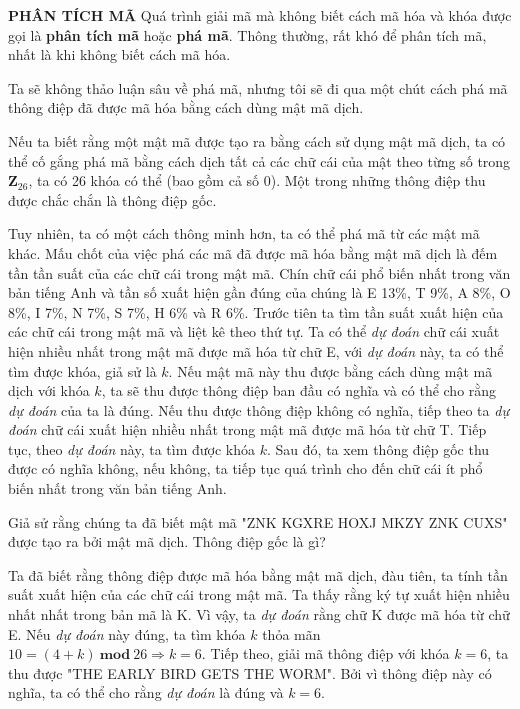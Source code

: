 \noindent \textcolor{Mycolor}{\textbf{PHÂN TÍCH MÃ}} Quá trình giải mã mà không biết cách mã hóa và khóa được gọi là \textbf{phân tích mã} hoặc \textbf{phá mã}. Thông thường, rất khó để phân tích mã, nhất là khi không biết cách mã hóa.

Ta sẽ không thảo luận sâu về phá mã, nhưng tôi sẽ đi qua một chút cách phá mã thông điệp đã được mã hóa bằng cách dùng mật mã dịch.

Nếu ta biết rằng một mật mã được tạo ra bằng cách sử dụng mật mã dịch, ta có thể cố gắng phá mã bằng cách dịch tất cả các chữ cái của mật theo từng số trong $\mathbf{Z}_{26}$, ta có 26 khóa có thể (bao gồm cả số 0). Một trong những thông điệp thu được chắc chắn là thông điệp gốc.

Tuy nhiên, ta có một cách thông minh hơn, ta có thể phá mã từ các mật mã khác. Mấu chốt của việc phá các mã đã được mã hóa bằng mật mã dịch là đếm tần tần suất của các chữ cái trong mật mã. Chín chữ cái phổ biến nhất trong văn bản tiếng Anh và tần số xuất hiện gần đúng của chúng là E 13\%, T 9\%, A 8\%, O 8\%, I 7\%, N 7\%, S 7\%, H 6\% và R 6\%. Trước tiên ta tìm tần suất xuất hiện của các chữ cái trong mật mã và liệt kê theo thứ tự. Ta có thể \textit{dự đoán} chữ cái xuất hiện nhiều nhất trong mật mã được mã hóa từ chữ E, với \textit{dự đoán} này, ta có thể tìm được khóa, giả sử là $k$. Nếu mật mã này thu được bằng cách dùng mật mã dịch với khóa $k$, ta sẽ thu được thông điệp ban đầu có nghĩa và có thể cho rằng \textit{dự đoán} của ta là đúng. Nếu thu được thông điệp không có nghĩa, tiếp theo ta \textit{dự đoán} chữ cái xuất hiện nhiều nhất trong mật mã được mã hóa từ chữ T. Tiếp tục, theo \textit{dự đoán} này, ta tìm được khóa $k$. Sau đó, ta xem thông điệp gốc thu được có nghĩa không, nếu không, ta tiếp tục quá trình cho đến chữ cái ít phổ biến nhất trong văn bản tiếng Anh.

\begin{example}
    Giả sử rằng chúng ta đã biết mật mã "ZNK KGXRE HOXJ MKZY ZNK CUXS" được tạo ra bởi mật mã dịch. Thông điệp gốc là gì?
\end{example}
\begin{solution}
    Ta đã biết rằng thông điệp được mã hóa bằng mật mã dịch, đàu tiên, ta tính tần suất xuất hiện của các chữ cái trong mật mã. Ta thấy rằng ký tự xuất hiện nhiều nhất nhất trong bản mã là K. Vì vậy, ta \textit{dự đoán} rằng chữ K được mã hóa từ chữ E. Nếu \textit{dự đoán} này đúng, ta tìm khóa $k$ thỏa mãn $10 = (4+k)\ \mathbf{mod}\ 26  \Rightarrow k = 6$. Tiếp theo, giải mã thông điệp với khóa $k=6$, ta thu được "THE EARLY BIRD GETS THE WORM". Bởi vì thông điệp này có nghĩa, ta có thể cho rằng \textit{dự đoán} là đúng và $k=6$.
\end{solution}


